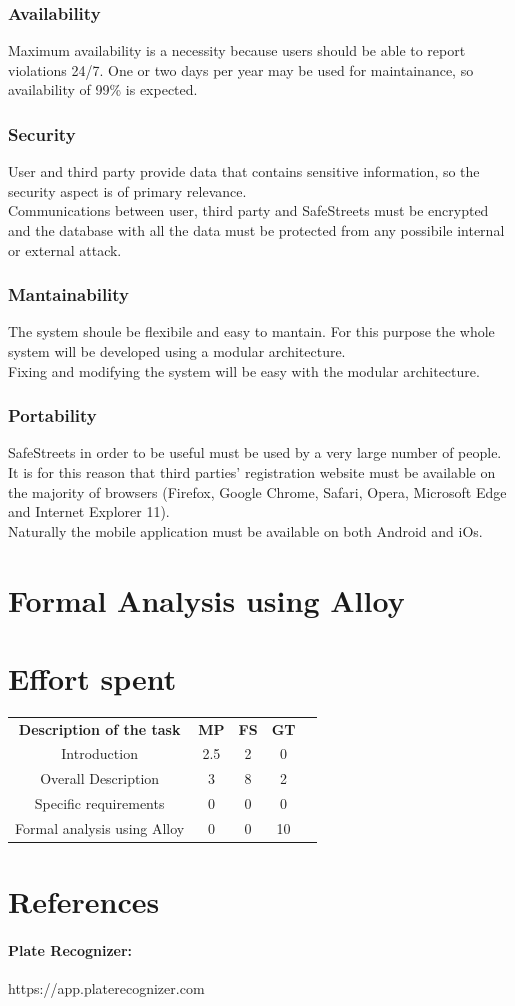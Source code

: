 \documentclass{article}
\begin{document}
\subsubsection{Availability}
Maximum availability is a necessity because users should be able to report
violations 24/7. One or two days per year may be used for maintainance, so 
availability of 99\% is expected.
\subsubsection{Security}
User and third party provide data that contains sensitive information, so the
security aspect is of primary relevance.\\ Communications between user, third
party and SafeStreets must be encrypted and the database with all the data must
be protected from any possibile internal or external attack.
\subsubsection{Mantainability}
The system shoule be flexibile and easy to mantain. For this purpose the whole
system will be developed using a modular architecture. \\
Fixing and modifying the system will be easy with the modular architecture.

\subsubsection{Portability}
SafeStreets in order to be useful must be used by a very large number of people.
It is for this reason that third parties' registration website must be available
on the majority of browsers (Firefox, Google Chrome, Safari, Opera, Microsoft
Edge and Internet Explorer 11).\\
Naturally the mobile application must be available on both Android and iOs.

\newpage
\section{Formal Analysis using Alloy}

\newpage
\section{Effort spent}
\begin{center}
    \begin{tabular}{|c|c|c|c|c|}
        \hline
        \textbf{Description of the task} & \textbf{MP} & \textbf{FS} &
        \textbf{GT} \\
        Introduction                    & 2.5   & 2     & 0     \\
        Overall Description             & 3     & 8     & 2     \\
        Specific requirements           & 0     & 0     & 0     \\
        Formal analysis using Alloy     & 0     & 0     & 10     \\
    \end{tabular}
\end{center}
\section{References}
    \paragraph{Plate Recognizer:} https://app.platerecognizer.com
    
\end{document}
